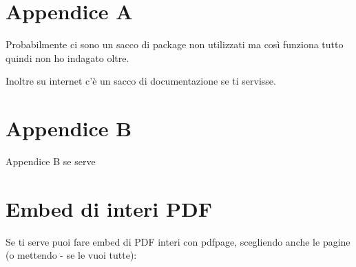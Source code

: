 \documentclass[12pt,a4paper,twoside]{book}
\begin{document}
\renewcommand{\appendixtocname}{Appendici}
\renewcommand{\appendixpagename}{Appendici}
{}
\begin{appendices}
    \chapter{Appendice A}
    \label{Appendice:A}
    Probabilmente ci sono un sacco di package non utilizzati ma così funziona tutto quindi non ho indagato oltre.

    Inoltre su internet c'è un sacco di documentazione se ti servisse.
    \chapter{Appendice B}
    \label{Appendice:B}
    Appendice B se serve

    \chapter{Embed di interi PDF}
    \label{Appendice:C}
    Se ti serve puoi fare embed di PDF interi con pdfpage, scegliendo anche le pagine (o mettendo - se le vuoi tutte):

    
\end{appendices}

\end{document}
